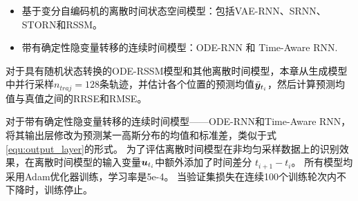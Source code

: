 \begin{itemize}
    \item 基于变分自编码机的离散时间状态空间模型：包括VAE-RNN、SRNN、STORN和RSSM。
    \item 带有确定性隐变量转移的连续时间模型：ODE-RNN 和 Time-Aware RNN.
\end{itemize}

对于具有随机状态转换的ODE-RSSM模型和其他离散时间模型，本章从生成模型中并行采样$n_{traj}=128$条轨迹，并估计各个位置的预测均值$\bar{\boldsymbol{y}}_{t_i}$，然后计算预测均值与真值之间的RRSE和RMSE。

对于带有确定性隐变量转移的连续时间模型——ODE-RNN和Time-Aware RNN，将其输出层修改为预测某一高斯分布的均值和标准差，类似于式\eqref{equ:output_layer}的形式。
为了评估离散时间模型在非均匀采样数据上的识别效果，在离散时间模型的输入变量$\boldsymbol{u}_{t_i}$中额外添加了时间差分 $t_{i+1}-t_i$。
所有模型均采用Adam优化器训练，学习率是5e-4。
当验证集损失在连续100个训练轮次内不下降时，训练停止。

